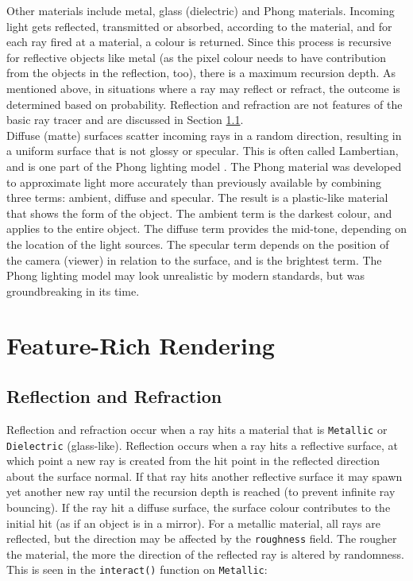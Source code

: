 \documentclass[a4paper]{article}
\begin{document}
Other materials include metal, glass (dielectric) and Phong materials. Incoming light gets reflected, transmitted or absorbed, according to the material, and for each ray fired at a material, a colour is returned. Since this process is recursive for reflective objects like metal (as the pixel colour needs to have contribution from the objects in the reflection, too), there is a maximum recursion depth. As mentioned above, in situations where a ray may reflect or refract, the outcome is determined based on probability. Reflection and refraction are not features of the basic ray tracer and are discussed in Section \ref{ss:reflandrefr}.\\

Diffuse (matte) surfaces scatter incoming rays in a random direction, resulting in a uniform surface that is not glossy or specular. This is often called Lambertian, and is one part of the Phong lighting model \cite{Phong1975lighting}. The Phong material was developed to approximate light more accurately than previously available by combining three terms: ambient, diffuse and specular. The result is a plastic-like material that shows the form of the object. The ambient term is the darkest colour, and applies to the entire object. The diffuse term provides the mid-tone, depending on the location of the light sources. The specular term depends on the position of the camera (viewer) in relation to the surface, and is the brightest term. The Phong lighting model may look unrealistic by modern standards, but was groundbreaking in its time.\\

\section{Feature-Rich Rendering}
\subsection{Reflection and Refraction}\label{ss:reflandrefr}
Reflection and refraction occur when a ray hits a material that is \texttt{Metallic} or \texttt{Dielectric} (glass-like). Reflection occurs when a ray hits a reflective surface, at which point a new ray is created from the hit point in the reflected direction about the surface normal. If that ray hits another reflective surface it may spawn yet another new ray until the recursion depth is reached (to prevent infinite ray bouncing). If the ray hit a diffuse surface, the surface colour contributes to the initial hit (as if an object is in a mirror). For a metallic material, all rays are reflected, but the direction may be affected by the \texttt{roughness} field. The rougher the material, the more the direction of the reflected ray is altered by randomness. This is seen  in the \texttt{interact()} function on \texttt{Metallic}:
\end{document}
